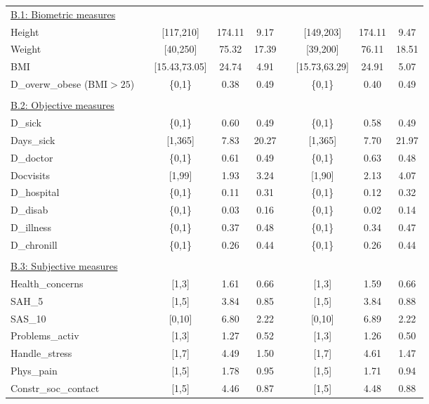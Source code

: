 \begin{center}
\begin{longtable}{l*{8}{c}}
\\	%
\underline{B.1: Biometric measures}\\
Height & & [117,210] & 174.11 & 9.17 &  & [149,203] & 174.11 & 9.47 \\ 
Weight & & [40,250] & 75.32 & 17.39 &  & [39,200] & 76.11 & 18.51 \\ 
BMI & & [15.43,73.05] & 24.74 & 4.91 &  & [15.73,63.29] & 24.91 & 5.07 \\ 
D\_overw\_obese (BMI$>25$) & & \{0,1\} &0.38 &0.49 &  & \{0,1\} &0.40 &0.49 \\




\\	%
\underline{B.2: Objective measures}\\
D\_sick & & \{0,1\} &0.60 &0.49 &  & \{0,1\} &0.58 &0.49 \\ 
Days\_sick & & [1,365] & 7.83 & 20.27 &  & [1,365] & 7.70 & 21.97 \\ 
D\_doctor & & \{0,1\} &0.61 &0.49 &  & \{0,1\} &0.63 &0.48 \\ 
Docvisits & & [1,99] & 1.93 & 3.24 &  & [1,90] & 2.13 & 4.07 \\ 
D\_hospital & & \{0,1\} &0.11 &0.31 &  & \{0,1\} &0.12 &0.32 \\ 
D\_disab & & \{0,1\} &0.03 &0.16 &  & \{0,1\} &0.02 &0.14 \\ 
D\_illness & & \{0,1\} &0.37 &0.48 &  & \{0,1\} &0.34 &0.47 \\ 
D\_chronill & & \{0,1\} &0.26 &0.44 &  & \{0,1\} &0.26 &0.44 \\ 






\\	%
\underline{B.3: Subjective measures}\\
Health\_concerns & & [1,3] & 1.61 &0.66 &  & [1,3] & 1.59 &0.66 \\ 
SAH\_5 & & [1,5] & 3.84 &0.85 &  & [1,5] & 3.84 &0.88 \\ 
SAS\_10 & & [0,10] & 6.80 & 2.22 &  & [0,10] & 6.89 & 2.22 \\ 
Problems\_activ & & [1,3] & 1.27 &0.52 &  & [1,3] & 1.26 &0.50 \\ 
Handle\_stress & & [1,7] & 4.49 & 1.50 &  & [1,7] & 4.61 & 1.47 \\ 
Phys\_pain & & [1,5] & 1.78 &0.95 &  & [1,5] & 1.71 &0.94 \\ 
Constr\_soc\_contact & & [1,5] & 4.46 &0.87 &  & [1,5] & 4.48 &0.88 \\






\end{longtable}
\end{center}
